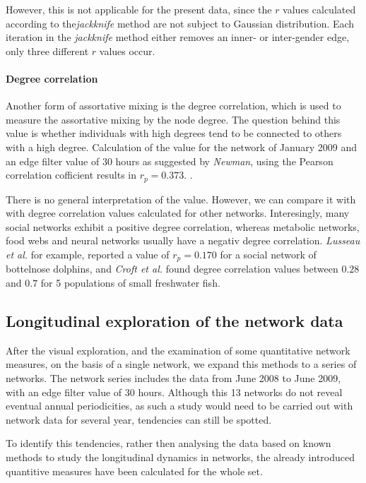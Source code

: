 However, this is not applicable for the present data, since the $r$ values calculated according to the\textit{jackknife} method are not subject to Gaussian distribution. Each iteration in the \textit{jackknife} method either removes an inner- or inter-gender edge, only three different $r$ values occur.

\paragraph{Degree correlation}
 
Another form of assortative mixing is the degree correlation, which is used to measure the assortative mixing by the node degree. The question behind this value is whether individuals with high degrees tend to be connected to others with a high degree\cite{croft:07}. Calculation of the value for the network of January 2009 and an edge filter value of 30 hours as suggested by \textit{Newman}\cite{newman:02}, using the Pearson correlation cofficient results in $r_p = 0.373$. \cite{newman:03a}. 

There is no general interpretation of the value. However, we can compare it with with degree correlation values calculated for other networks. Interesingly, many social networks exhibit a positive degree correlation, whereas metabolic networks, food webs and neural networks usually have a negativ degree correlation\cite{newman:03a}. \textit{Lusseau et al.}\cite{lusseau:06} for example, reported a value of $r_p = 0.170$ for a social network of bottelnose dolphins, and \textit{Croft et al.}\cite{croft:05} found degree correlation values between $0.28$ and $0.7$ for 5 populations of small freshwater fish.   
 
\subsection{Longitudinal exploration of the network data}
\label{subsec:longitudinal}

After the visual exploration, and the examination of some quantitative network measures, on the basis of a single network, we expand this methods to a series of networks. The network series includes the data from June 2008 to June 2009, with an edge filter value of 30 hours. Although this 13 networks do not reveal eventual annual periodicities, as such a study would need to be carried out with network data for several year, tendencies can still be spotted.
 
To identify this tendencies, rather then analysing the data based on known methods to study the longitudinal dynamics in networks\cite{snijders:05}, the already introduced quantitive measures have been calculated for the whole set.


